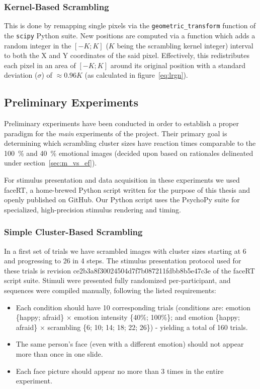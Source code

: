 	    \subsubsection{Kernel-Based Scrambling}\label{sec:m_vs_si_kbs}
	    This is done by remapping single pixels via the \colorbox{vlg}{\texttt{geometric\_transform}} function of the \colorbox{vlg}{\texttt{scipy}} Python suite. 
	    New positions are computed via a function which adds a random integer in the $[-K;K]$ ($K$ being the scrambling kernel integer) interval to both the X and Y coordinates of the said pixel.
	    Effectively, this redistributes each pixel in an area of $[-K;K]$ around its original position with a standard deviation ($\sigma$) of $\approx 0.96K$ (as calculated in figure~\ref{eq:lrgn}). 
	\subsection{Preliminary Experiments} 
	Preliminary experiments have been conducted in order to establish a proper paradigm for the \textit{main} experiments of the project. 
	Their primary goal is determining which scrambling cluster sizes have reaction times comparable to the \SI{100}{\percent} and \SI{40}{\percent} emotional images (decided upon based on rationales delineated under section~\ref{sec:m_vs_ef}).
	
	For stimulus presentation and data acquisition in these experiments we used faceRT\cite{faceRT}, a home-brewed Python script written for the purpose of this thesis and openly published on GitHub.
	Our Python script uses the PsychoPy suite\cite{Peirce2008} for specialized, high-precision stimulus rendering and timing.   
	    \subsubsection{Simple Cluster-Based Scrambling}
	    In a first set of trials we have scrambled images with cluster sizes starting at \SI{6}{\pixel} and progressing to \SI{26}{\pixel} in \SI{4}{\pixel} steps.
	    The stimulus presentation protocol used for these trials is revision \textcolor{lg}{ce2b3a8f30024504d7f7b087211fdbb8b5e47c3e} of the faceRT\cite{faceRT} script suite.
	    Stimuli were presented fully randomized per-participant, and sequences were compiled manually, following the listed requirements:
	    \begin{itemize}
		\item Each condition should have 10 corresponding trials (conditions are: emotion \{happy; afraid\} $\times$ emotion intensity \{40\%; 100\%\}; and emotion \{happy; afraid\} $\times$ scrambling \{6; 10; 14; 18; 22; 26\}) - yielding a total of 160 trials.
		\item The same person's face (even with a different emotion) should not appear more than once in one slide.
		\item Each face picture should appear no more than 3 times in the entire experiment.
	    \end{itemize}
